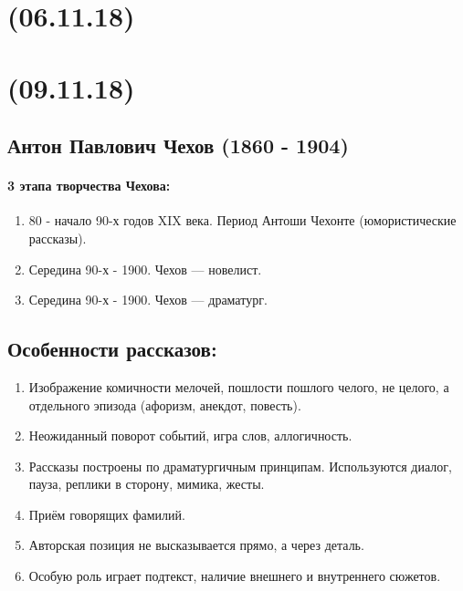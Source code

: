\documentclass{article}
\begin{document}
\newpage
\noindent\makebox[\linewidth]{\rule{\paperwidth}{0.4pt}}
\section{(06.11.18)}
\noindent\makebox[\linewidth]{\rule{\paperwidth}{0.4pt}}




\newpage
\noindent\makebox[\linewidth]{\rule{\paperwidth}{0.4pt}}
\section{(09.11.18)}
\noindent\makebox[\linewidth]{\rule{\paperwidth}{0.4pt}}

\subsection{Антон Павлович Чехов (1860 - 1904)}

\paragraph{3 этапа творчества Чехова:}
\begin{enumerate}
\item
  80 - начало 90-х годов XIX века. Период Антоши Чехонте (юмористические рассказы).
\item
  Середина 90-х - 1900. Чехов --- новелист.
\item
  Середина 90-х - 1900. Чехов --- драматург.
\end{enumerate}

\subsection{Особенности рассказов:}
\begin{enumerate}
\item
  Изображение комичности мелочей, пошлости пошлого челого, не целого, а отдельного эпизода (афоризм, анекдот, повесть).
\item
  Неожиданный поворот событий, игра слов, аллогичность.
\item
  Рассказы построены по драматургичным принципам. Используются диалог, пауза, реплики в сторону, мимика, жесты.
\item
  Приём говорящих фамилий.
\item
  Авторская позиция не высказывается прямо, а через деталь.
\item
  Особую роль играет подтекст, наличие внешнего и внутреннего сюжетов.
\end{enumerate}
\end{document}
